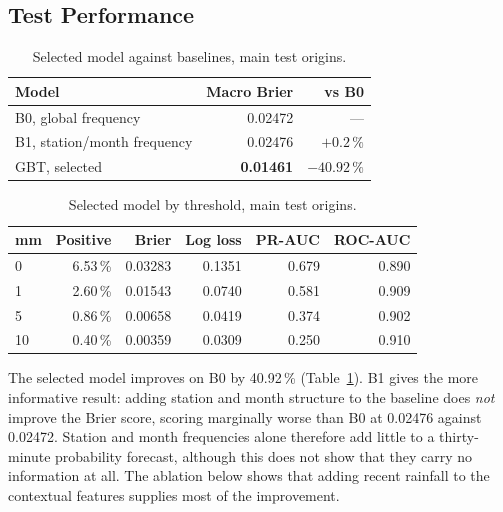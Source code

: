 \documentclass[10pt,a4paper,twocolumn,twoside]{rho-class/rho}
\begin{document}
\subsection{Test Performance}
\label{sec:testperf}
\begin{table}[H]
\caption{Selected model against baselines, main test origins.}
\label{tab:test}
\centering
\small
\setlength{\tabcolsep}{3pt}
\begin{tabular}{lrr}
\toprule
\textbf{Model} & \textbf{Macro Brier} & \textbf{vs B0} \\
\midrule
B0, global frequency & 0.02472 & --- \\
B1, station/month frequency & 0.02476 & $+0.2\,\%$ \\
GBT, selected & \textbf{0.01461} & $-40.92\,\%$ \\
\bottomrule
\end{tabular}
\end{table}

\begin{table}[H]
\caption{Selected model by threshold, main test origins.}
\label{tab:perthreshold}
\centering
\scriptsize
\setlength{\tabcolsep}{2.5pt}
\begin{tabular}{lrrrrr}
\toprule
\textbf{mm} & \textbf{Positive} & \textbf{Brier} & \textbf{Log loss} & \textbf{PR-AUC} & \textbf{ROC-AUC} \\
\midrule
0 & 6.53\,\% & 0.03283 & 0.1351 & 0.679 & 0.890 \\
1 & 2.60\,\% & 0.01543 & 0.0740 & 0.581 & 0.909 \\
5 & 0.86\,\% & 0.00658 & 0.0419 & 0.374 & 0.902 \\
10 & 0.40\,\% & 0.00359 & 0.0309 & 0.250 & 0.910 \\
\bottomrule
\end{tabular}
\end{table}

The selected model improves on B0 by 40.92\,\% (Table~\ref{tab:test}). B1 gives the more informative result: adding station and month structure to the baseline does \emph{not} improve the Brier score, scoring marginally worse than B0 at 0.02476 against 0.02472. Station and month frequencies alone therefore add little to a thirty-minute probability forecast, although this does not show that they carry no information at all. The ablation below shows that adding recent rainfall to the contextual features supplies most of the improvement.
\end{document}
